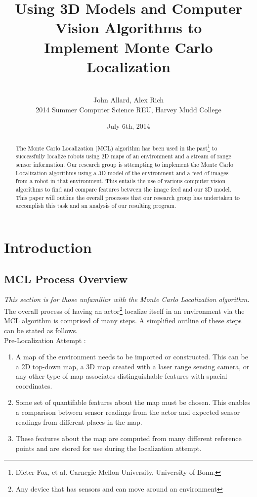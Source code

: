 \documentclass[a4paper,11pt]{article}
\title{Using 3D Models and Computer Vision Algorithms to \\ Implement Monte Carlo Localization}
\author{ \\[7in]  John Allard, Alex Rich \\ 2014 Summer Computer Science REU, Harvey Mudd College}
\date{July 6th, 2014 \\}
\begin{document}
  \maketitle   
  \newpage  
  
  \tableofcontents
  
  \newpage
 
  \begin{abstract}  
  The Monte Carlo Localization (MCL) algorithm has been used in the past\footnote{ Dieter Fox, et al. Carnegie Mellon University, University of Bonn.} to successfully localize robots using 2D maps of an environment and a stream of range  sensor information. Our research group is attempting to implement the Monte Carlo Localization algorithms  using a 3D model of the environment and a feed of images from a robot in that environment. This entails the use of various computer vision algorithms to find and compare features between the image feed and our 3D model. This paper will outline the overall processes that our research group has undertaken to accomplish this task and an analysis of our resulting program. 
  \end{abstract}
  
  \section{Introduction} 
  
  \subsection{MCL Process Overview}
  \emph{This section is for those unfamiliar with the Monte Carlo Localization algorithm.}\\ The overall process of having an actor\footnote{Any device that has sensors and can move around an environment} localize itself in an environment via the MCL algorithm is comprised of many steps. A simplified outline of these steps can be stated as follows.\\
  
  Pre-Localization Attempt :
  
  \begin{enumerate}
  \item A map of the environment needs to be imported or constructed. This can be a 2D top-down map, a 3D map created with a 
  laser range sensing camera, or any other type of map associates distinguishable features with spacial coordinates.
  \item Some set of quantifable features about the map must be chosen. This enables a comparison between sensor readings from the actor and expected sensor readings from different places in the map.
  \item These features about the map are computed from many different reference points and are stored for use during the localization attempt.
  \end{enumerate}
  
\end{document}
